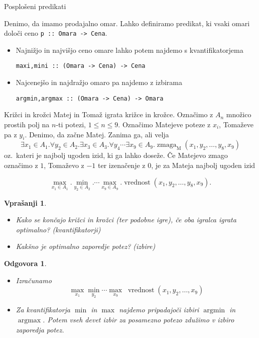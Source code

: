 \documentclass{beamer}
\newtheorem{vpr}{Vprašanji}
\newtheorem{odg}{Odgovora}
\def\obs{\exists}
\def\fora{\forall}
\newcommand{\argmin}{\operatorname{argmin}}
\newcommand{\argmax}{\operatorname{argmax}}
\begin{document}
\begin{frame}[fragile]{Posplošeni predikati}

Denimo, da imamo prodajalno omar. Lahko definiramo predikat, ki vsaki omari določi ceno \lstinline$p :: Omara -> Cena$. 
\begin{itemize}
\item Najnižjo in najvišjo ceno omare lahko potem najdemo s kvantifikatorjema
\begin{lstlisting}
maxi,mini :: (Omara -> Cena) -> Cena
\end{lstlisting}
\item Najcenejšo in najdražjo omaro pa najdemo z izbirama
\begin{lstlisting}
argmin,argmax :: (Omara -> Cena) -> Omara
\end{lstlisting}
\end{itemize}
\end{frame}

\begin{frame}{Križci in krožci}
Matej in Tomaž igrata križce in krožce. Označimo z $A_n$ množico prostih polj na $n$-ti potezi, $1\leq n\leq 9$.
Označimo Matejeve poteze z $x_i$, Tomaževe pa z $y_i$. Denimo, da začne Matej.  Zanima ga, ali velja
$$\obs x_1\in A_1.\fora y_2 \in A_2. \obs x_3\in A_3.\fora y_4 \cdots \obs x_9 \in A_9. \operatorname{zmaga}_\text{M}(x_1,y_2,\dots, y_8,x_9) $$
\pause
oz.\ kateri je najbolj ugoden izid, ki ga lahko doseže. Če Matejevo zmago označimo z $1$, Tomaževo z $-1$ ter izenačenje z $0$, je za Mateja najbolj ugoden izid

$$\max_{x_1\in A_1}. \min_{y_2\in A_2}. \cdots \max_{x_9\in A_9}. \operatorname{vrednost}(x_1, y_2,\dots, y_8, x_9)\text{.}$$


\end{frame}

\begin{frame}
\begin{vpr}
	\begin{itemize}
	\item Kako se končajo križci in krožci (ter podobne igre), če oba igralca igrata optimalno? (kvantifikatorji)
	\item Kakšno je optimalno zaporedje potez? (izbire)
	\end{itemize}
\end{vpr}
\pause
\begin{odg}
	\begin{itemize}
	\item Izračunamo $$\max_{x_1}\min_{y_2}\cdots \max_{x_9}\;\operatorname{vrednost}(x_1, y_2,\dots, x_9)$$
	\item Za kvantifikatorja $\min$ in $\max$ najdemo pripadajoči izbiri $\argmin$ in $\argmax$. Potem vseh devet izbir
	za posamezno potezo zdužimo v izbiro zaporedja potez.
	\end{itemize}
\end{odg}

\end{frame}
\end{document}
